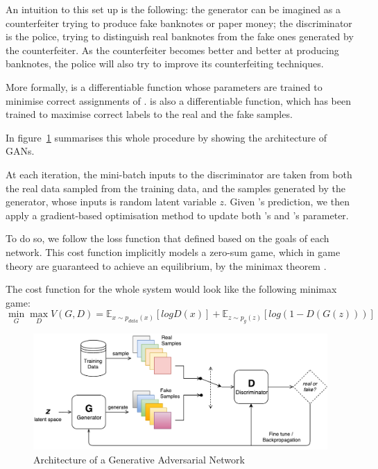 An intuition to this set up is the following: the generator  can be imagined as a counterfeiter trying to produce fake banknotes or paper money; the discriminator  is the police, trying to distinguish real banknotes from the fake ones generated by the counterfeiter. As the counterfeiter becomes better and better at producing banknotes, the police will also try to improve its counterfeiting techniques.

More formally,  is a differentiable function whose parameters are trained to minimise correct assignments of .  is also a differentiable function, which has been trained to maximise correct labels to the real and the fake samples.

In figure~\ref{fig:VanillaGAN} summarises this whole procedure by showing the architecture of GANs.

At each iteration, the mini-batch inputs to the discriminator  are taken from both the real data sampled from the training data, and the samples generated by the generator, whose inputs is random latent variable $z$. Given 's prediction, we then apply a gradient-based optimisation method to update both 's and 's parameter.

To do so, we follow the loss function that defined based on the goals of each network. This cost function implicitly models a zero-sum game, which in game theory are guaranteed to achieve an equilibrium, by the minimax theorem \citep{du2013minimax}.

The cost function for the whole system would look like the following minimax game:
\[\min_{G} \max_{D} V(G, D) = \mathbb{E}_{x\sim p_{data}(x)}[log D(x)] + \mathbb{E}_{z \sim p_{g}(z)}[log(1-D(G(z)))] \]

\begin{figure}
\centering
\includegraphics[width=15cm]{Figures/VanillaGAN}
\caption{Architecture of a Generative Adversarial Network}
\label{fig:VanillaGAN}
\end{figure}

